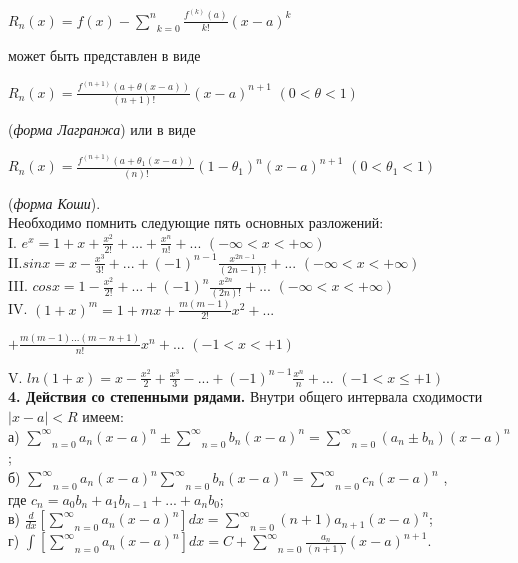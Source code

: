 \documentclass{book}
\begin{document}
\begin{center}
    \(R_n(x) = f(x) - \underset{k = 0}{\overset{n}{\sum}} \frac{f^{(k)}(a)}{k!}(x - a)^k\)
\end{center}
может быть представлен в виде\\
\begin{center}
    \(R_n(x) = \frac{f^{(n+1)}(a+\theta(x - a))}{(n+1)!}(x-a)^{n+1}\) \((0 < \theta < 1)\)
\end{center}
(\emph{форма Лагранжа}) или в виде \\
\begin{center}
    \(R_n(x) = \frac{f^{(n+1)}(a+\theta_1(x - a))}{(n)!}(1-\theta_1)^{n}(x - a)^{n+1}\) \((0 < \theta_1 < 1)\)
\end{center}
(\emph{форма Коши}). \\
\onehalfspacing \quad Необходимо помнить следующие пять основных разложений: \\
\doublespacing
I. \quad \(e^x = 1 + x + \frac{x^2}{2!} + ... + \frac{x^n}{n!} + ...\) \((-\infty < x < +\infty)\) \\
II.\quad \(sin x = x - \frac{x^3}{3!} + ... + (-1)^{n-1} \frac{x^{2n-1}}{(2n-1)!} + ...\) \((-\infty < x < +\infty)\) \\
III. \quad \(cos x = 1 - \frac{x^2}{2!} + ... + (-1)^n\frac{x^{2n}}{(2n)!} + ...\) \((-\infty < x < +\infty)\) \\
IV. \((1+x)^m = 1 + mx + \frac{m(m-1)}{2!}x^2 + ... \)\\

\begin{raggedleft}
    \(+ \frac{m(m-1)...(m-n+1)}{n!}x^n + ...\) \((-1 < x < +1)\) \\
\end{raggedleft}
V. \quad \(ln(1 + x) = x - \frac{x^2}{2} + \frac{x^3}{3} - ... + (-1)^{n-1}\frac{x^n}{n} + ... \) \((-1 < x \leq +1)\) \\
\singlespacing 
\qquad \textbf{4. Действия со степенными рядами.} Внутри общего интервала сходимости \(|x-a| < R\) имеем: 
\\
\qquad\qquad\qquad а) \(\underset{n = 0}{\overset{\infty}{\sum}} a_n(x - a)^n \pm \underset{n = 0}{\overset{\infty}{\sum}} b_n(x - a)^n = \underset{n = 0}{\overset{\infty}{\sum}} (a_n \pm b_n)(x - a)^n\) ;\\
\qquad\qquad\qquad б) \(\underset{n = 0}{\overset{\infty}{\sum}} a_n(x - a)^n  \underset{n = 0}{\overset{\infty}{\sum}} b_n(x - a)^n = \underset{n = 0}{\overset{\infty}{\sum}} c_n(x - a)^n\) ,\\
где \(c_n = a_0b_n + a_1b_{n-1} + ... + a_nb_0\);\\
\qquad\qquad\qquad в) \(\frac{d}{dx} \left[\underset{n = 0}{\overset{\infty}{\sum}} a_n(x - a)^n \right] dx = \underset{n = 0}{\overset{\infty}{\sum}} (n+1)a_{n+1}(x-a)^{n}\);\\
\qquad\qquad\qquad г) \( \int \left[\underset{n = 0}{\overset{\infty}{\sum}} a_n(x - a)^n \right] dx = C + \underset{n = 0}{\overset{\infty}{\sum}} \frac{a_n}{(n+1)}(x-a)^{n+1}\). \\
\end{document}
